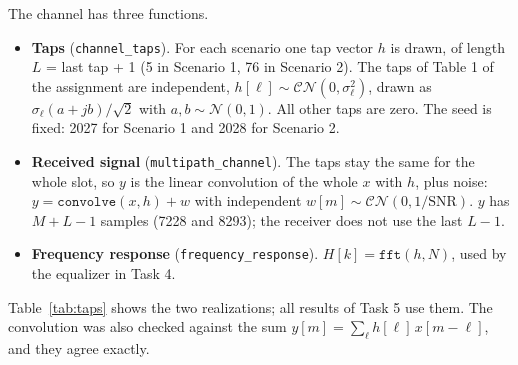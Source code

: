 \documentclass[11pt,a4paper]{article}
\newcommand{\SNR}{\mathrm{SNR}}
\begin{document}
The channel has three functions.
\begin{itemize}
  \item \textbf{Taps} (\texttt{channel\_taps}). For each scenario one tap vector $h$ is drawn, of length
        $L$ = last tap + 1 (5 in Scenario 1, 76 in Scenario 2). The taps of Table 1 of the assignment are independent,
        $h[\ell] \sim \mathcal{CN}(0, \sigma_\ell^2)$, drawn as $\sigma_\ell (a + jb)/\sqrt{2}$ with
        $a, b \sim \mathcal{N}(0, 1)$. All other taps are zero. The seed is fixed: 2027 for Scenario 1
        and 2028 for Scenario 2.
  \item \textbf{Received signal} (\texttt{multipath\_channel}). The taps stay the same for the whole slot,
        so $y$ is the linear convolution of the whole $x$ with $h$, plus noise:
        $y = \texttt{convolve}(x, h) + w$ with independent $w[m] \sim \mathcal{CN}(0, 1/\SNR)$.
        $y$ has $M + L - 1$ samples (7228 and 8293); the receiver does not use the last $L - 1$.
  \item \textbf{Frequency response} (\texttt{frequency\_response}). $H[k] = \texttt{fft}(h, N)$, used by
        the equalizer in Task 4.
\end{itemize}
Table~\ref{tab:taps} shows the two realizations; all results of Task 5 use them. The convolution was
also checked against the sum $y[m] = \sum_\ell h[\ell]\, x[m - \ell]$, and they agree exactly.
\end{document}
